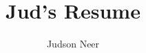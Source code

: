 \documentclass{article}
\begin{document}
\title{Jud's Resume}
\author{Judson Neer}

\maketitle
\end{document}
